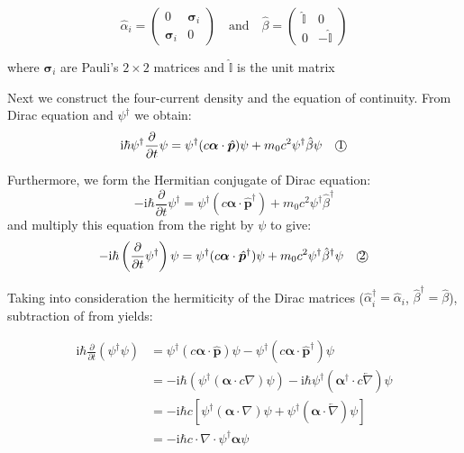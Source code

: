 \begin{equation}
\hat{\alpha}_i = \begin{pmatrix} 0 & \bm{\sigma}_i \\ \bm{\sigma}_i & 0 \end{pmatrix} \quad \text{and} \quad \hat{\beta} = \begin{pmatrix} \hat{\mathbb{I}} & 0 \\ 0 & -\hat{\mathbb{I}} \end{pmatrix}
\end{equation}

where $\bm{\sigma}_i$ are Pauli's $2 \times 2$ matrices and $\hat{\mathbb{I}}$ is the unit matrix

Next we construct the four-current density and the equation of continuity. From Dirac equation and $\psi^\dagger$ we obtain:
\begin{equation}
\mathrm{i}\hbar \psi^\dagger \frac{\partial}{\partial t} \psi = \psi^\dagger (c \bm{\alpha} \cdot \hat{\bm{p}}) \psi + m_0 c^2 \psi^\dagger \hat{\beta} \psi \quad \text{\textcircled{1}}
\end{equation}

Furthermore, we form the Hermitian conjugate of Dirac equation:
\begin{equation}
-\mathrm{i}\hbar \frac{\partial}{\partial t} \psi^\dagger = \psi^\dagger (c \bm{\alpha} \cdot \hat{\bm{p}}^\dagger) + m_0 c^2 \psi^\dagger \hat{\beta}^\dagger
\end{equation}
and multiply this equation from the right by $\psi$ to give:
\begin{equation}
-\mathrm{i}\hbar \left( \frac{\partial}{\partial t} \psi^\dagger \right) \psi = \psi^\dagger (c \bm{\alpha} \cdot \hat{\bm{p}}^\dagger) \psi + m_0 c^2 \psi^\dagger \hat{\beta}^\dagger \psi \quad \text{\textcircled{2}}
\end{equation}

Taking into consideration the hermiticity of the Dirac matrices ($\hat{\alpha}_i^\dagger = \hat{\alpha}_i$, $\hat{\beta}^\dagger = \hat{\beta}$), subtraction of  from  yields:

\begin{equation}
\begin{aligned}
\mathrm{i}\hbar \frac{\partial}{\partial t} (\psi^\dagger \psi) &= \psi^\dagger (c \bm{\alpha} \cdot \hat{\bm{p}}) \psi - \psi^\dagger (c \bm{\alpha} \cdot \hat{\bm{p}}^\dagger) \psi \\
&= -\mathrm{i}\hbar ( \psi^\dagger (\bm{\alpha} \cdot c \nabla) \psi ) - \mathrm{i}\hbar \psi^\dagger (\bm{\alpha}^\dagger \cdot c \overleftarrow{\nabla}) \psi \\
&= -\mathrm{i}\hbar c [ \psi^\dagger (\bm{\alpha} \cdot \nabla) \psi + \psi^\dagger (\bm{\alpha} \cdot \overleftarrow{\nabla}) \psi ] \\
&= -\mathrm{i}\hbar c \cdot \nabla \cdot \psi^\dagger \bm{\alpha} \psi
\end{aligned}
\end{equation}

